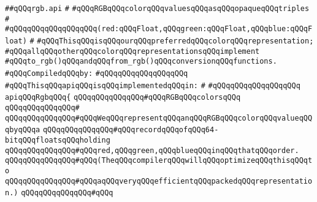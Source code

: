 \label{src/lib/x-kit/xclient/src/color/rgb.api}
\verb|##qQQqrgb.api|\newline
\verb|#|\newline
\verb|#qQQqRGBqQQqcolorqQQqvaluesqQQqasqQQqopaqueqQQqtriples|\newline
\verb|#|\newline
\verb|#qQQqqQQqqQQqqQQqqQQq(red:qQQqFloat,qQQqgreen:qQQqFloat,qQQqblue:qQQqFloat)|\newline
\verb|#|\newline
\verb|#qQQqThisqQQqisqQQqourqQQqpreferredqQQqcolorqQQqrepresentation;|\newline
\verb|#qQQqallqQQqotherqQQqcolorqQQqrepresentationsqQQqimplement|\newline
\verb|#qQQqto_rgb()qQQqandqQQqfrom_rgb()qQQqconversionqQQqfunctions.|\newline
\newline
\verb|#qQQqCompiledqQQqby:|\newline
\verb|#qQQqqQQqqQQqqQQqqQQq|\newline
\newline
\verb|#qQQqThisqQQqapiqQQqisqQQqimplementedqQQqin:|\newline
\verb|#|\newline
\verb|#qQQqqQQqqQQqqQQqqQQq|\newline
\newline
\verb|apiqQQqRgbqQQq{|\newline
\newline
\verb|qQQqqQQqqQQqqQQq#qQQqRGBqQQqcolorsqQQq|\newline
\verb|qQQqqQQqqQQqqQQq#|\newline
\verb|qQQqqQQqqQQqqQQq#qQQqWeqQQqrepresentqQQqanqQQqRGBqQQqcolorqQQqvalueqQQqbyqQQqa|\newline
\verb|qQQqqQQqqQQqqQQq#qQQqrecordqQQqofqQQq64-bitqQQqfloatsqQQqholding|\newline
\verb|qQQqqQQqqQQqqQQq#qQQqred,qQQqgreen,qQQqblueqQQqinqQQqthatqQQqorder.|\newline
\verb|qQQqqQQqqQQqqQQq#qQQq(TheqQQqcompilerqQQqwillqQQqoptimizeqQQqthisqQQqto|\newline
\verb|qQQqqQQqqQQqqQQq#qQQqaqQQqveryqQQqefficientqQQqpackedqQQqrepresentation.)|\newline
\verb|qQQqqQQqqQQqqQQq#qQQq|\newline
